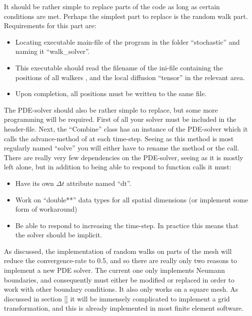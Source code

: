 It should be rather simple to replace parts of the code as long as certain conditions are met. Perhaps the simplest part to replace is the random walk part. 
Requirements for this part are:
\begin{itemize}
 \item Locating executable main-file of the program in the folder ``stochastic'' and naming it ``walk\_solver''. 
 \item This executable should read the filename of the ini-file containing the positions of all walkers , and the local diffusion ``tensor'' in the relevant area.
 \item Upon completion, all positions must be written to the same file.
\end{itemize}
The PDE-solver should also be rather simple to replace, but some more programming will be required. First of all your solver must be included in the header-file. 
Next, the ``Combine'' class has an instance of the PDE-solver which it calls the advance-method of at each time-step. Seeing as this method is most regularly named ``solve'' you will either have to rename the method or the call. 
There are really very few dependencies on the PDE-solver, seeing as it is mostly left alone, but in addition to being able to respond to function calls it must:
\begin{itemize}
 \item Have its own $\Delta t$ attribute named ``dt''.
 \item Work on ``double**'' data types for all spatial dimensions (or implement some form of workaround)
 \item Be able to respond to increasing the time-step. In practice this means that the solver should be implicit.
\end{itemize}
As discussed, the implementation of random walks on parts of the mesh will reduce the convergence-rate to 0.5, and so there are really only two reasons to implement a new PDE solver. 
The current one only implements Neumann boundaries, and consequently must either be modified or replaced in order to work with other boundary conditions.
It also only works on a square mesh. As discussed in section \ref{} it will be immensely complicated to implement a grid transformation, and this is already implemented in most finite element software.